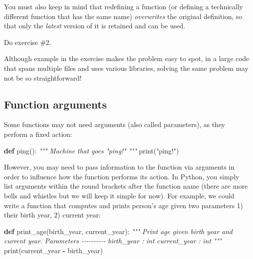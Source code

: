 \documentclass[
]{book}
\newenvironment{Shaded}{\begin{snugshade}}{\end{snugshade}}
\newcommand{\BuiltInTok}[1]{#1}
\newcommand{\CommentTok}[1]{\textcolor[rgb]{0.56,0.35,0.01}{\textit{#1}}}
\newcommand{\KeywordTok}[1]{\textcolor[rgb]{0.13,0.29,0.53}{\textbf{#1}}}
\newcommand{\NormalTok}[1]{#1}
\newcommand{\OperatorTok}[1]{\textcolor[rgb]{0.81,0.36,0.00}{\textbf{#1}}}
\newcommand{\StringTok}[1]{\textcolor[rgb]{0.31,0.60,0.02}{#1}}
\begin{document}
You must also keep in mind that redefining a function (or defining a technically different function that has the same name) \emph{overwrites} the original definition, so that only the \emph{latest} version of it is retained and can be used.

Do exercise \#2.

Although example in the exercise makes the problem easy to spot, in a large code that spans multiple files and uses various libraries, solving the same problem may not be so straightforward!

\hypertarget{function-arguments}{%
\subsection{Function arguments}\label{function-arguments}}

Some functions may not need arguments (also called parameters), as they perform a fixed action:

\begin{Shaded}
\begin{Highlighting}[]
\KeywordTok{def}\NormalTok{ ping():}
    \CommentTok{"""}
\CommentTok{    Machine that goes "ping!"}
\CommentTok{    """}
    \BuiltInTok{print}\NormalTok{(}\StringTok{"ping!"}\NormalTok{)}
\end{Highlighting}
\end{Shaded}

However, you may need to pass information to the function via arguments in order to influence how the function performs its action. In Python, you simply list arguments within the round brackets after the function name (there are more bells and whistles but we will keep it simple for now). For example, we could write a function that computes and prints person's age given two parameters 1) their birth year, 2) current year:

\begin{Shaded}
\begin{Highlighting}[]
\KeywordTok{def}\NormalTok{ print\_age(birth\_year, current\_year):}
    \CommentTok{"""}
\CommentTok{    Print age given birth year and current year.}
\CommentTok{    }
\CommentTok{    Parameters}
\CommentTok{    {-}{-}{-}{-}{-}{-}{-}{-}{-}{-}}
\CommentTok{    birth\_year : int}
\CommentTok{    current\_year : int}
\CommentTok{    """}
    \BuiltInTok{print}\NormalTok{(current\_year }\OperatorTok{{-}}\NormalTok{ birth\_year)}
\end{Highlighting}
\end{Shaded}
\end{document}
